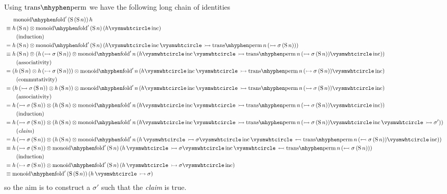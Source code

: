 \documentclass[12pt, parskip, DIV=14]{scrbook}
\renewcommand{\circ}{\vysmwhtcircle}
\newcommand{\Suc}{\operatorname{S}}
\newcommand{\monfold}{\operatorname{monoid\mhyphen fold}}
\newcommand{\trans}{\operatorname{trans\mhyphen perm}}
\newcommand{\inc}{\operatorname{inc}}
\begin{document}
Using $\trans$ we have the following long chain of identities
\begin{align*}
  &\quad\ \monfold'\,(\Suc\,(\Suc n))\,h \\
  &\equiv h\,(\Suc n) \otimes \monfold'\,(\Suc n)\,(h \circ \inc) \\
  &\qquad \text{(induction)} \\
  &= h\,(\Suc n) \otimes \monfold'\,(\Suc n)\,(h \circ \inc \circ\,\rightarrowtail \trans n\,(\rightarrowtail \sigma\,(\Suc n))) \\
  &\equiv h\,(\Suc n) \otimes (h\,(\rightarrowtail \sigma\,(\Suc n)) \otimes \monfold' n\,(h \circ \inc \circ\,\rightarrowtail \trans n\,(\rightarrowtail \sigma\,(\Suc n)) \circ \inc)) \\
  &\qquad \text{(associativity)} \\
  &= (h\,(\Suc n) \otimes h\,(\rightarrowtail \sigma\,(\Suc n))) \otimes \monfold' n\,(h \circ \inc \circ\,\rightarrowtail \trans n\,(\rightarrowtail \sigma\,(\Suc n)) \circ \inc) \\
  &\qquad \text{(commutativity)} \\
  &= (h\,(\rightarrowtail \sigma\,(\Suc n)) \otimes h\,(\Suc n)) \otimes \monfold' n\,(h \circ \inc \circ\,\rightarrowtail \trans n\,(\rightarrowtail \sigma\,(\Suc n)) \circ \inc) \\
  &\qquad \text{(associativity)} \\
  &= h\,(\rightarrowtail \sigma\,(\Suc n)) \otimes (h\,(\Suc n) \otimes \monfold' n\,(h \circ \inc \circ\,\rightarrowtail \trans n\,(\rightarrowtail \sigma\,(\Suc n)) \circ \inc)) \\
  &\qquad \text{(induction)} \\
  &= h\,(\rightarrowtail \sigma\,(\Suc n)) \otimes (h\,(\Suc n) \otimes \monfold' n\,(h \circ \inc \circ\,\rightarrowtail \trans n\,(\rightarrowtail \sigma\,(\Suc n)) \circ \inc \circ\,\rightarrowtail \sigma')) \\
  &\qquad \text{(\textit{claim})} \\
  &= h\,(\rightarrowtail \sigma\,(\Suc n)) \otimes (h\,(\Suc n) \otimes \monfold' n\,(h\,\circ\,\rightarrowtail \sigma \circ \inc \circ\,\leftarrowtail \trans n\,(\leftarrowtail \sigma\,(\Suc n)) \circ \inc)) \\
  &\equiv h\,(\rightarrowtail \sigma\,(\Suc n)) \otimes \monfold'\,(\Suc n)\,(h \,\circ\,\rightarrowtail \sigma \circ \inc \circ\,\leftarrowtail \trans n\,(\leftarrowtail \sigma\,(\Suc n))) \\
  &\qquad \text{(induction)} \\
  &= h\,(\rightarrowtail \sigma\,(\Suc n)) \otimes \monfold'\,(\Suc n)\,(h \,\circ\,\rightarrowtail \sigma \circ \inc) \\
  &\equiv \monfold'\,(\Suc\,(\Suc n))\,(h \,\circ\,\rightarrowtail \sigma)
\end{align*}
so the aim is to construct a $\sigma'$ such that the \textit{claim} is true.
\end{document}
